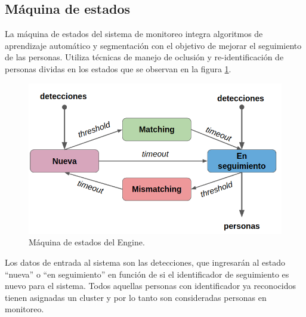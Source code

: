 \newpage

\subsection{Máquina de estados}
\label{sec:maquinaEstados}

La máquina de estados del sistema de monitoreo integra algoritmos de aprendizaje automático y segmentación con el objetivo de mejorar el seguimiento de las personas. Utiliza técnicas de manejo de oclusión y re-identificación de personas dividas en los estados que se observan en la figura \ref{fig:maquinaEstados}.

\begin{figure}[ht]
	\centering
	\includegraphics[scale=.6]{./Figures/maquinaEstados.png}
	\caption{Máquina de estados del Engine.}
	\label{fig:maquinaEstados}
\end{figure}

Los datos de entrada al sistema son las detecciones, que ingresarán al estado ``nueva'' o ``en seguimiento'' en función de si el identificador de seguimiento es nuevo para el sistema. Todos aquellas personas con identificador ya reconocidos tienen asignadas un cluster y por lo tanto son consideradas personas en monitoreo.

